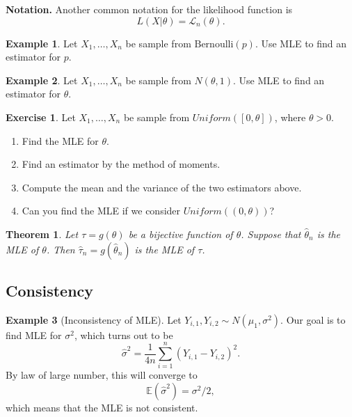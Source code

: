 \documentclass[
  openany]{book}
\newtheorem{theorem}{Theorem}[chapter]
\theoremstyle{definition}
\theoremstyle{definition}
\newtheorem{example}{Example}[chapter]
\theoremstyle{definition}
\newtheorem{exercise}{Exercise}[chapter]
\theoremstyle{definition}
\theoremstyle{remark}
\begin{document}
\textbf{Notation.} Another common notation for the likelihood function is
\[ L(X|\theta) = \mathcal{L}_n(\theta).\]

\begin{example}
Let \(X_1, \dots, X_n\) be sample from \(\mathrm{Bernoulli}(p)\).
Use MLE to find an estimator for \(p\).
\end{example}

\begin{example}
Let \(X_1, \dots, X_n\) be sample from \(N(\theta, 1)\).
Use MLE to find an estimator for \(\theta\).
\end{example}

\begin{exercise}

Let \(X_1, \dots, X_n\) be sample from \(Uniform([0,\theta])\), where \(\theta >0\).

\begin{enumerate}
\def\labelenumi{\arabic{enumi}.}
\item
  Find the MLE for \(\theta\).
\item
  Find an estimator by the method of moments.
\item
  Compute the mean and the variance of the two estimators above.
\item
  Can you find the MLE if we consider \(Uniform((0,\theta))\)?
\end{enumerate}

\end{exercise}

\begin{theorem}
Let \(\tau = g(\theta)\) be a bijective function of \(\theta\).
Suppose that \(\hat \theta_n\) is the MLE of \(\theta\).
Then \(\hat \tau_n = g(\hat \theta_n)\) is the MLE of \(\tau\).
\end{theorem}

\subsection{Consistency}\label{consistency}

\begin{example}[Inconsistency of MLE]
Let \(Y_{i,1}, Y_{i,2} \sim N(\mu_1, \sigma^2)\). Our goal is to find MLE for \(\sigma^2\), which
turns out to be
\[\hat \sigma^2 = \frac{1}{4n} \sum_{i=1}^n (Y_{i,1} - Y_{i,2})^2.\]
By law of large number, this will converge to
\[\mathbb{E}(\hat \sigma^2) = \sigma^2/2,\]
which means that the MLE is not consistent.
\end{example}
\end{document}
